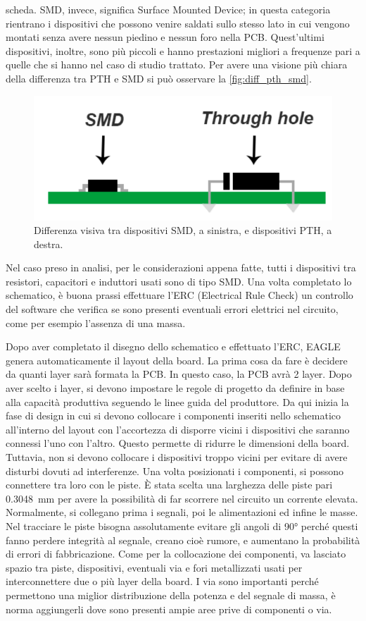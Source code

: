 scheda. SMD, invece, significa Surface Mounted Device; in questa categoria rientrano i dispositivi che possono venire saldati sullo stesso 
lato in cui vengono montati senza avere nessun piedino e nessun foro nella PCB. Quest'ultimi dispositivi, inoltre, sono più piccoli e 
hanno prestazioni migliori a frequenze pari a quelle che si hanno nel caso di studio trattato. Per avere una visione più chiara della differenza 
tra PTH e SMD si può osservare la \autoref*{fig:diff_pth_smd}.
\begin{figure}[h!]
    \centering
    \includegraphics[width=.65\linewidth]{img/diff_pth_smd.png}
    \caption{Differenza visiva tra dispositivi SMD, a sinistra, e dispositivi PTH, a destra.}
    \label{fig:diff_pth_smd}
\end{figure}
Nel caso preso in analisi, per le considerazioni appena fatte, tutti i dispositivi tra resistori, capacitori e induttori usati sono di tipo SMD.
Una volta completato lo schematico, è buona prassi effettuare l'ERC (Electrical Rule Check) un controllo del software che verifica se sono presenti
eventuali errori elettrici nel circuito, come per esempio l'assenza di una massa.

Dopo aver completato il disegno dello schematico e effettuato l'ERC, EAGLE genera automaticamente il layout della board. La prima 
cosa da fare è decidere da quanti layer sarà formata la PCB. In questo caso, la PCB avrà 2 layer. Dopo aver scelto i layer, si devono 
impostare le regole di progetto da definire in base alla capacità produttiva seguendo le linee guida del produttore. Da qui inizia la fase 
di design in cui si devono collocare i componenti inseriti nello schematico all'interno del layout con l'accortezza di disporre vicini i 
dispositivi che saranno connessi l'uno con l'altro. Questo permette di ridurre le dimensioni della board. Tuttavia, non si devono collocare i dispositivi troppo vicini per evitare di avere disturbi dovuti ad 
interferenze. Una volta posizionati i componenti, si possono connettere tra loro con le piste. È stata scelta una larghezza delle piste
pari \SI{0.3048}{\milli\meter} per avere la possibilità di far scorrere nel circuito un corrente elevata.
Normalmente, si collegano prima i segnali, poi le alimentazioni ed infine le masse. Nel tracciare le piste bisogna assolutamente evitare gli angoli
di \ang{90} perché questi fanno perdere integrità al segnale, creano cioè rumore, e aumentano la probabilità di errori di fabbricazione. Come per la collocazione dei 
componenti, va lasciato spazio tra piste, dispositivi, eventuali via e fori metallizzati usati per interconnettere due o più layer della board.
I via sono importanti perché permettono una miglior distribuzione della potenza e del segnale di massa, è norma aggiungerli dove sono presenti
ampie aree prive di componenti o via.

